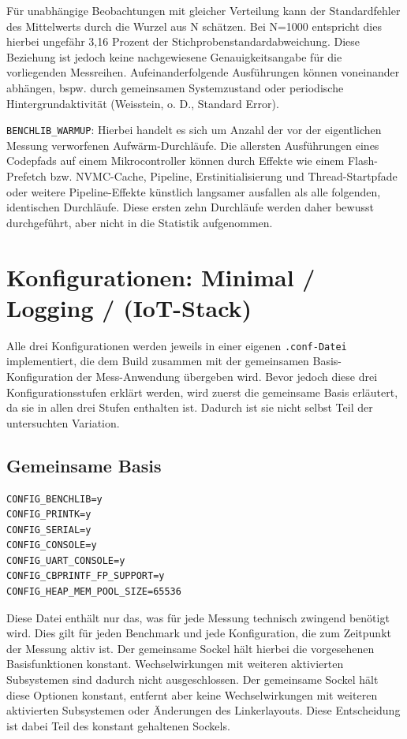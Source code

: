 F{\"u}r unabh{\"a}ngige Beobachtungen mit gleicher Verteilung kann der Standardfehler des Mittelwerts durch die Wurzel aus N sch{\"a}tzen. Bei N=1000 entspricht dies hierbei ungef{\"a}hr 3,16 Prozent der Stichprobenstandardabweichung. Diese Beziehung ist jedoch keine nachgewiesene Genauigkeitsangabe f{\"u}r die vorliegenden Messreihen. Aufeinanderfolgende Ausf{\"u}hrungen k{\"o}nnen voneinander abh{\"a}ngen, bspw. durch gemeinsamen Systemzustand oder periodische Hintergrundaktivit{\"a}t (Weisstein, o. D., \glqq{}Standard Error\grqq{}).

\lstinline[style=codeinline]|BENCHLIB_WARMUP|: Hierbei handelt es sich um Anzahl der vor der eigentlichen Messung verworfenen \glqq{}Aufw{\"a}rm\grqq{}-Durchl{\"a}ufe. Die allersten Ausf{\"u}hrungen eines Codepfads auf einem Mikrocontroller k{\"o}nnen durch Effekte wie einem Flash-Prefetch bzw. NVMC-Cache, Pipeline, Erstinitialisierung und Thread-Startpfade oder weitere Pipeline-Effekte k{\"u}nstlich langsamer ausfallen als alle folgenden, identischen Durchl{\"a}ufe. Diese ersten zehn Durchl{\"a}ufe werden daher bewusst durchgef{\"u}hrt, aber nicht in die Statistik aufgenommen.

\section{Konfigurationen: Minimal / Logging / (IoT-Stack)}
Alle drei Konfigurationen werden jeweils in einer eigenen \lstinline[style=codeinline]|.conf-Datei| implementiert, die dem Build zusammen mit der gemeinsamen Basis-Konfiguration der Mess-Anwendung {\"u}bergeben wird. Bevor jedoch diese drei Konfigurationsstufen erkl{\"a}rt werden, wird zuerst die gemeinsame Basis erl{\"a}utert, da sie in allen drei Stufen enthalten ist. Dadurch ist sie nicht selbst Teil der untersuchten Variation.

\subsection{Gemeinsame Basis}
\begin{lstlisting}[style=basecode,language=Kconfig]
CONFIG_BENCHLIB=y
CONFIG_PRINTK=y
CONFIG_SERIAL=y
CONFIG_CONSOLE=y
CONFIG_UART_CONSOLE=y
CONFIG_CBPRINTF_FP_SUPPORT=y
CONFIG_HEAP_MEM_POOL_SIZE=65536
\end{lstlisting}
Diese Datei enth{\"a}lt nur das, was f{\"u}r jede Messung technisch zwingend ben{\"o}tigt wird. Dies gilt f{\"u}r jeden Benchmark und jede Konfiguration, die zum Zeitpunkt der Messung aktiv ist. Der gemeinsame Sockel h{\"a}lt hierbei die vorgesehenen Basisfunktionen konstant. Wechselwirkungen mit weiteren aktivierten Subsystemen sind dadurch nicht ausgeschlossen. Der gemeinsame Sockel h{\"a}lt diese Optionen konstant, entfernt aber keine Wechselwirkungen mit weiteren aktivierten Subsystemen oder {\"A}nderungen des Linkerlayouts. Diese Entscheidung ist dabei Teil des konstant gehaltenen Sockels.

